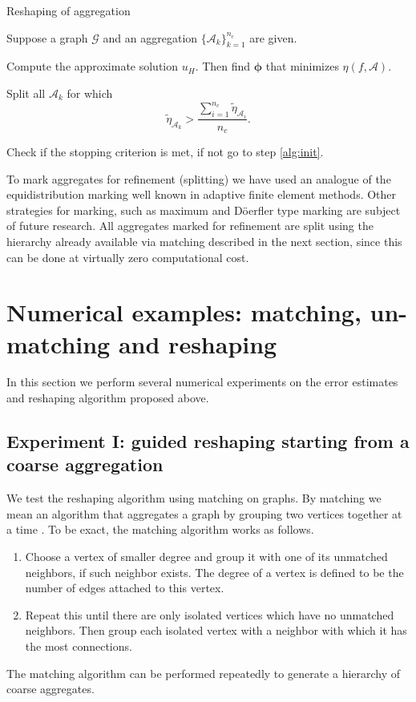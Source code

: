 \documentclass[ ]{elsarticle}
\newcommand{\cA}{\mathcal{A}}
\newcommand{\cG}{\mathcal{G}}
\numberwithin{equation}{section}
\newcommand{\red}[1]{#1}
\begin{document}
\begin{algorithm}
  \caption{Reshaping of aggregation}\label{alg:reshaping}
  \begin{algorithmic}[1]
    \State \red{Suppose a graph $\cG$ and an aggregation
      $\{\cA_k\}_{k=1}^{n_c}$ are given.}
    
    \State Compute the approximate solution $u_H$. Then find $\bm\phi$
    that minimizes $\eta(f,\cA)$\label{alg:init}.
    
    \State Split all $\cA_k$ for which\label{alg:split}
    \begin{equation*}
      \tilde\eta_{\cA_k} > \frac{\sum_{i=1}^{n_c}\tilde\eta_{\cA_i}}{n_c}.
    \end{equation*}
    
    \State Check if the stopping criterion is met, if not go to step
    \ref{alg:init}.
  \end{algorithmic}
\end{algorithm}
To mark aggregates for refinement (splitting) we have used an analogue
of the equidistribution marking well known in adaptive finite element
methods. Other strategies for marking, such as maximum and D\"oerfler
type marking \cite{2009NochettoSiebert, 1996DoerflerW-aa} are subject
of future research.  All aggregates marked for refinement are split
using the hierarchy already available via matching described in the
next section, since this can be done at virtually zero computational
cost.



\section{Numerical examples: matching, un-matching and reshaping}
In this section we perform several numerical experiments on the error
estimates and reshaping algorithm proposed above.

\subsection{Experiment I: guided reshaping starting from a coarse
  aggregation}
We test the reshaping algorithm using matching on graphs. By matching
we mean an algorithm that aggregates a graph by grouping two vertices
together at a time \cite{MR1639073}. To be exact, the matching
algorithm works as follows.
\begin{enumerate}
\item Choose a vertex of smaller degree and group it with one of its
  unmatched neighbors, if such neighbor exists. The degree of a vertex
  is defined to be the number of edges attached to this vertex.
\item Repeat this until there are only isolated vertices which have no
  unmatched neighbors. Then group each isolated vertex with a neighbor
  with which it has the most connections.
\end{enumerate}
The matching algorithm can be performed repeatedly to generate a
hierarchy of coarse aggregates.
\end{document}
